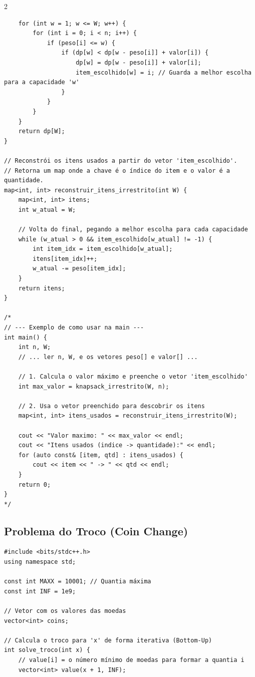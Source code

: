 \documentclass[11pt]{article}
\begin{document}
\begin{multicols}{2}
\begin{lstlisting}
    for (int w = 1; w <= W; w++) {
        for (int i = 0; i < n; i++) {
            if (peso[i] <= w) {
                if (dp[w] < dp[w - peso[i]] + valor[i]) {
                    dp[w] = dp[w - peso[i]] + valor[i];
                    item_escolhido[w] = i; // Guarda a melhor escolha para a capacidade 'w'
                }
            }
        }
    }
    return dp[W];
}

// Reconstrói os itens usados a partir do vetor 'item_escolhido'.
// Retorna um map onde a chave é o índice do item e o valor é a quantidade.
map<int, int> reconstruir_itens_irrestrito(int W) {
    map<int, int> itens;
    int w_atual = W;

    // Volta do final, pegando a melhor escolha para cada capacidade
    while (w_atual > 0 && item_escolhido[w_atual] != -1) {
        int item_idx = item_escolhido[w_atual];
        itens[item_idx]++;
        w_atual -= peso[item_idx];
    }
    return itens;
}

/*
// --- Exemplo de como usar na main ---
int main() {
    int n, W;
    // ... ler n, W, e os vetores peso[] e valor[] ...
    
    // 1. Calcula o valor máximo e preenche o vetor 'item_escolhido'
    int max_valor = knapsack_irrestrito(W, n);
    
    // 2. Usa o vetor preenchido para descobrir os itens
    map<int, int> itens_usados = reconstruir_itens_irrestrito(W);
    
    cout << "Valor maximo: " << max_valor << endl;
    cout << "Itens usados (indice -> quantidade):" << endl;
    for (auto const& [item, qtd] : itens_usados) {
        cout << item << " -> " << qtd << endl;
    }
    return 0;
}
*/
\end{lstlisting}

\subsection{Problema do Troco (Coin Change)}
\begin{lstlisting}
#include <bits/stdc++.h>
using namespace std;

const int MAXX = 10001; // Quantia máxima
const int INF = 1e9;

// Vetor com os valores das moedas
vector<int> coins;

// Calcula o troco para 'x' de forma iterativa (Bottom-Up)
int solve_troco(int x) {
    // value[i] = o número mínimo de moedas para formar a quantia i
    vector<int> value(x + 1, INF);
    

\end{lstlisting}
\end{multicols}
\end{document}
